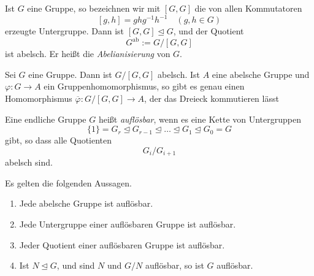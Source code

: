 \documentclass[11pt, a4paper]{article}
\begin{document}
\begin{definition}[Abelianisierung]
\Theorem
Ist $G$ eine Gruppe, so bezeichnen wir mit $[G,G]$ die von allen Kommutatoren
\[
[g,h] = ghg^{-1}h^{-1} \quad (g,h \in G)
\]
erzeugte Untergruppe. Dann ist $[G,G] \trianglelefteq G$, und der Quotient
\[
G^{\mathrm{ab}} := G/[G,G]
\]
ist abelsch. Er heißt die \emph{Abelianisierung} von $G$.
\end{definition}

\begin{lemma} \label{Universelle Eigenschaft der Abelianisierung}
Sei $G$ eine Gruppe. Dann ist $G/[G,G]$ abelsch. Ist $A$ eine abelsche Gruppe und $\varphi : G \to A$ ein Gruppenhomomorphismus, so gibt es genau einen Homomorphismus $\overline{\varphi}: G/[G,G]\to A$, der das Dreieck kommutieren lässt

\begin{figure}[h]
    \centering
{}
\end{figure}
\end{lemma}


\begin{definition}
Eine endliche Gruppe $G$ heißt \emph{auflösbar}, wenn es eine Kette von Untergruppen
$$
\{1\} = G_r \trianglelefteq G_{r-1} \trianglelefteq \dots \trianglelefteq G_1 \trianglelefteq G_0 = G
$$
gibt, so dass alle Quotienten
$$
G_i / G_{i+1}
$$
abelsch sind.
\end{definition}


\begin{lemma}
\Theorem
Es gelten die folgenden Aussagen.
\begin{enumerate}[label=(\roman*)]
    \item Jede abelsche Gruppe ist auflösbar.
    \item Jede Untergruppe einer auflösbaren Gruppe ist auflösbar.
    \item Jeder Quotient einer auflösbaren Gruppe ist auflösbar.
    \item Ist $N \trianglelefteq G$, und sind $N$ und $G/N$ auflösbar, so ist $G$ auflösbar.
\end{enumerate}
\end{lemma}
\end{document}
